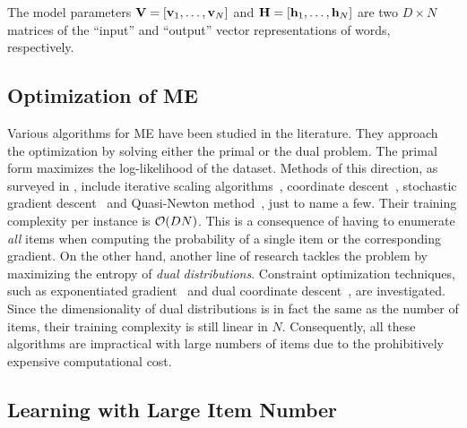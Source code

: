 The model parameters $\mathbf{V}=[\mathbf{v}_1, \dots, \mathbf{v}_N]$ and $\mathbf{H}=[\mathbf{h}_1, \dots,
\mathbf{h}_N]$ are two $D \times N$ matrices of the ``input'' and ``output'' vector
representations of words, respectively.

\subsection{Optimization of ME}

Various algorithms for ME have been studied in the literature. They approach the
optimization by solving either the primal or the dual problem. The primal form
maximizes the log-likelihood of the dataset. Methods of this direction, as
surveyed in \cite{malouf2002comparison,yuan2012recent}, include iterative
scaling algorithms~\cite{berger1996maximum,darroch1972generalized}, coordinate
descent~\cite{huang2010iterative}, stochastic gradient
descent~\cite{tsuruoka2009stochastic} and Quasi-Newton
method~\cite{gao2007comparative}, just to name a few. Their training complexity
per instance is $\mathcal{O}(DN)$. This is a consequence of having to enumerate
\emph{all} items when computing the probability of a single item or the
corresponding gradient. On the other hand, another line of research tackles the
problem by maximizing the entropy of \emph{dual distributions}.  Constraint
optimization techniques, such as exponentiated
gradient~\cite{collins2008exponentiated} and dual coordinate
descent~\cite{yu2011dual}, are investigated. Since the dimensionality of dual
distributions is in fact the same as the number of items, their training
complexity is still linear in $N$. Consequently, all these algorithms are
impractical with large numbers of items due to the prohibitively expensive
computational cost.

\subsection{Learning with Large Item Number}

